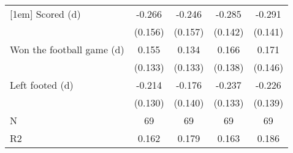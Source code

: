 {\begin{tabular}{l*{4}{c}}
[1em]
Scored (d)          &      -0.266\sym{*}  &      -0.246         &      -0.285\sym{**} &      -0.291\sym{**} \\
                    &     (0.156)         &     (0.157)         &     (0.142)         &     (0.141)         \\
[1em]
Won the football game (d)&       0.155         &       0.134         &       0.166         &       0.171         \\
                    &     (0.133)         &     (0.133)         &     (0.138)         &     (0.146)         \\
[1em]
Left footed (d)     &      -0.214\sym{*}  &      -0.176         &      -0.237\sym{*}  &      -0.226         \\
                    &     (0.130)         &     (0.140)         &     (0.133)         &     (0.139)         \\
\hline
N                   &          69         &          69         &          69         &          69         \\
R2                  &       0.162         &       0.179         &       0.163         &       0.186         \\
\hline\hline
\end{tabular}
}

